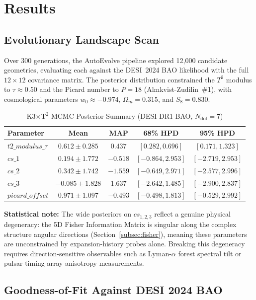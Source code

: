 \section{Results}

\subsection{Evolutionary Landscape Scan}
Over 300 generations, the AutoEvolve pipeline explored 12{,}000 candidate geometries, evaluating each against the DESI~2024 BAO likelihood with the full $12 \times 12$ covariance matrix. The posterior distribution constrained the $T^2$ modulus to $\tau \approx 0.50$ and the Picard number to $P = 18$ (Almkvist-Zudilin~\#1), with cosmological parameters $w_0 \approx -0.974$, $\Omega_m = 0.315$, and $S_8 = 0.830$.

\begin{table}[h]
\centering
\caption{K3$\times$T$^2$ MCMC Posterior Summary (DESI DR1 BAO, $N_{\text{dof}} = 7$)}
\label{tab:posterior}
\begin{tabular}{lcccc}
\toprule
Parameter & Mean & MAP & 68\% HPD & 95\% HPD \\
\midrule
$t2\_modulus\_\tau$ & $0.612 \pm 0.285$ & $0.437$ & $[0.282, 0.696]$ & $[0.171, 1.323]$ \\
$cs\_1$ & $0.194 \pm 1.772$ & $-0.518$ & $[-0.864, 2.953]$ & $[-2.719, 2.953]$ \\
$cs\_2$ & $0.342 \pm 1.742$ & $-1.559$ & $[-0.649, 2.971]$ & $[-2.577, 2.996]$ \\
$cs\_3$ & $-0.085 \pm 1.828$ & $1.637$ & $[-2.642, 1.485]$ & $[-2.900, 2.837]$ \\
$picard\_offset$ & $0.971 \pm 1.097$ & $-0.493$ & $[-0.498, 1.813]$ & $[-0.529, 2.992]$ \\
\bottomrule
\end{tabular}
\end{table}

\textbf{Statistical note:} The wide posteriors on $cs_{1,2,3}$ reflect a genuine physical degeneracy: the 5D Fisher Information Matrix is singular along the complex structure angular directions (Section~\ref{subsec:fisher}), meaning these parameters are unconstrained by expansion-history probes alone.  Breaking this degeneracy requires direction-sensitive observables such as Lyman-$\alpha$ forest spectral tilt or pulsar timing array anisotropy measurements.

\subsection{Goodness-of-Fit Against DESI 2024 BAO}
\label{subsec:desi_chi2}

